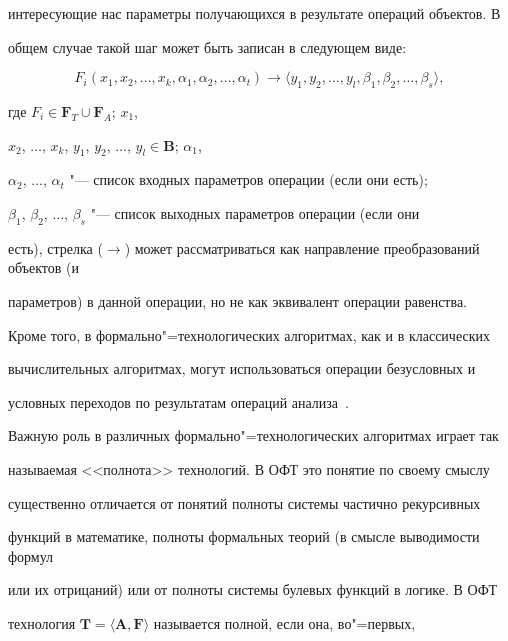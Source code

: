 интересующие нас параметры получающихся в результате операций объектов. В

общем случае такой шаг может быть записан в следующем виде:

\begin{equation}

F_{i} (x_{1}, x_{2},\ldots, x_{k}, \alpha_{1}, \alpha_{2},\ldots, \alpha_{t})

\to \langle y_{1}, y_{2},\ldots, y_{l}, \beta_{1}, \beta_{2},\ldots, \beta_{s}\rangle,

\label{krylov:eq4}

\end{equation}

где $F_i \in  \mathbf{F}_{T} \cup \mathbf{F}_{A}$; $x_1$,

$x_{2}$, $\ldots$, $x_{k}$, $y_{1}$, $y_{2}$, $\ldots$, $y_{l} \in \mathbf{B}$; $\alpha_{1}$,

$\alpha_{2}$, $\ldots$, $\alpha_{t}$ "--- список входных параметров операции (если они есть);

$\beta_{1}$, $\beta_{2}$, $\ldots$, $\beta_{s}$ "--- список выходных параметров операции (если они

есть), стрелка ($\to$) может рассматриваться как направление преобразований объектов (и

параметров) в данной операции, но не как эквивалент операции равенства.



Кроме того, в формально"=технологических алгоритмах, как и в классических

вычислительных алгоритмах, могут использоваться операции безусловных и

условных переходов по результатам операций анализа~\cite{krylov:bib3,krylov:bib6}.



Важную роль в различных формально"=технологических алгоритмах играет так

называемая <<полнота>> технологий. В ОФТ это понятие по своему смыслу

существенно отличается от понятий полноты системы частично рекурсивных

функций в математике, полноты формальных теорий (в смысле выводимости формул

или их отрицаний) или от полноты системы булевых функций в логике. В ОФТ

технология $\mathbf{T}=\langle \mathbf{A}, \mathbf{F} \rangle$ называется полной, если она, во"=первых,

